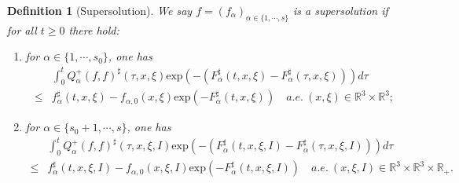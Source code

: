 \documentclass[reqno,11pt]{amsart}
\newtheorem{definition}{Definition}[section]
\numberwithin{equation}{section}
\def\R{\mathbb{R}}
\def\exp{\mathrm{exp}}
\begin{document}
\begin{definition}[Supersolution]\label{SupperSolution}
  We say $f = (f_\alpha)_{\alpha \in \{ 1, \cdots, s \}}$ is a supersolution if for all $t \geq 0$ there hold:
  \begin{enumerate}
		\item {for $\alpha \in \{1,\cdots,s_0\}$, one has
	\begin{equation*}
		\begin{aligned}
			&\int_{0}^{t}Q^+_{\alpha } (f,f)^\sharp (\tau ,x,\xi ) \exp(-(F^\sharp _{\alpha } (t,x,\xi )-F^\sharp _{\alpha } (\tau,x,\xi ))) d \tau \\
			\leq &f^{\sharp}_\alpha (t,x,\xi) -f_{\alpha ,0} (x,\xi )\exp(-F^\sharp _{\alpha  } (t,x,\xi )) \quad a.e. \ (x,\xi ) \in \R^3 \times \R^3;
		\end{aligned}
	\end{equation*}}
	\item {for $\alpha \in \{s_0+1,\cdots,s\}$, one has
	\begin{equation*}
		\begin{aligned}
			&\int_{0}^{t}Q^+_{\alpha } (f,f)^\sharp (\tau ,x,\xi ,I) \exp(-(F^\sharp _{\alpha } (t,x,\xi ,I)-F^\sharp _{\alpha } (\tau,x,\xi ,I))) d \tau \\
			\leq &f^{\sharp}_\alpha (t,x,\xi ,I) -f_{\alpha ,0} (x,\xi ,I )\exp(-F^\sharp _{\alpha  } (t,x,\xi ,I)) \quad a.e. \ (x,\xi ,I) \in \R^3 \times \R^3 \times \R_+.
		\end{aligned}
	\end{equation*}}
\end{enumerate}
\end{definition}
\end{document}
